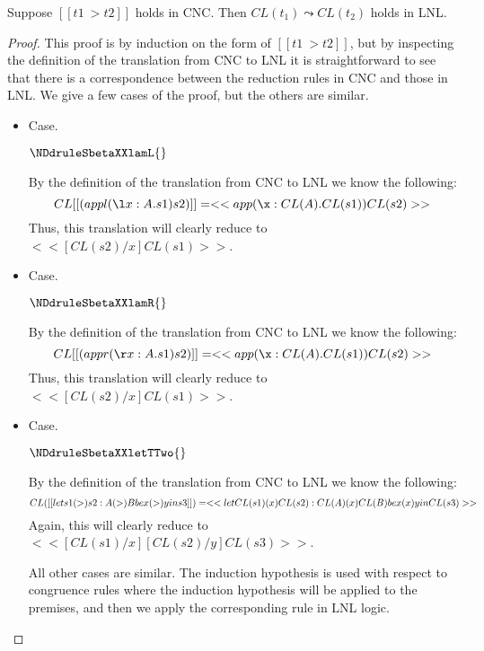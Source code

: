 \begin{lemma}
  Suppose $[[t1 ~> t2]]$ holds in CNC. Then $CL(t_1)\leadsto CL(t_2)$ holds
  in LNL.
\end{lemma}
\begin{proof}
  This proof is by induction on the form of $[[t1 ~> t2]]$, but by
  inspecting the definition of the translation from CNC to LNL it is
  straightforward to see that there is a correspondence between the
  reduction rules in CNC and those in LNL.  We give a few cases of the
  proof, but the others are similar.

  \begin{itemize}
  \item[] Case.
    \begin{center}
      $\NDdruleSbetaXXlamL{}$
    \end{center}
    By the definition of the translation from CNC to LNL we know the following:
    \[
    CL[[(appl (\l x:A.s1) s2)]] = <<app (\x:CL(A).CL(s1)) CL(s2)>>\\
    \]
    Thus, this translation will clearly reduce to $<< [CL(s2)/x]CL(s1)>>$.

  \item[] Case.
    \begin{center}
      $\NDdruleSbetaXXlamR{}$
    \end{center}
    By the definition of the translation from CNC to LNL we know the following:
    \[
    CL[[(appr (\r x:A.s1) s2)]] = <<app (\x:CL(A).CL(s1)) CL(s2)>>\\
    \]
    Thus, this translation will clearly reduce to $<< [CL(s2)/x]CL(s1)>>$.

  \item[] Case.
    \begin{center}
      $\NDdruleSbetaXXletTTwo{}$
    \end{center}
    By the definition of the translation from CNC to LNL we know the following:
    \[
    CL([[let s1 (>) s2 : A (>) B be x (>) y in s3]]) = <<let CL(s1) (x) CL(s2) : CL(A) (x) CL(B) be x (x) y in CL(s3)>>\\
    \]
    Again, this will clearly reduce to $<< [CL(s1)/x][CL(s2)/y]CL(s3) >>$.

    All other cases are similar.  The induction hypothesis is used
    with respect to congruence rules where the induction hypothesis
    will be applied to the premises, and then we apply the
    corresponding rule in LNL logic.
  \end{itemize}
\end{proof}



















